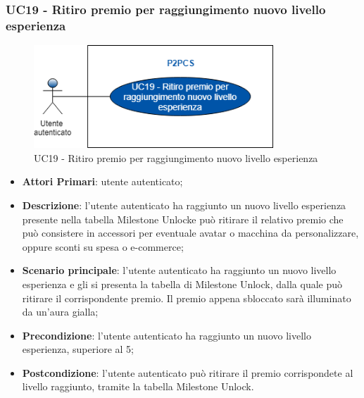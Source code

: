 \subsubsection{UC19 - Ritiro premio per raggiungimento nuovo livello esperienza}
\begin{figure}[h]
	\includegraphics[width=9cm]{res/images/uc19.png}
	\centering
	\caption{UC19 - Ritiro premio per raggiungimento nuovo livello esperienza}
\end{figure}
\begin{itemize}
	\item \textbf{Attori Primari}: utente autenticato;
	\item \textbf{Descrizione}: l'utente autenticato ha raggiunto un nuovo livello esperienza presente nella tabella Milestone Unlock\glosp e può ritirare il relativo premio che può consistere in accessori per eventuale avatar o macchina da personalizzare, oppure sconti su spesa o e-commerce;	
	\item \textbf{Scenario principale}: l'utente autenticato ha raggiunto un nuovo livello esperienza e gli si presenta la tabella di Milestone Unlock, dalla quale può ritirare il corrispondente premio. Il premio appena sbloccato sarà illuminato da un'aura gialla;
	\item \textbf{Precondizione}: l'utente autenticato ha raggiunto un nuovo livello esperienza, superiore al 5;
	\item \textbf{Postcondizione}: l'utente autenticato può ritirare il premio corrispondete al livello raggiunto, tramite la tabella Milestone Unlock.
\end{itemize}
